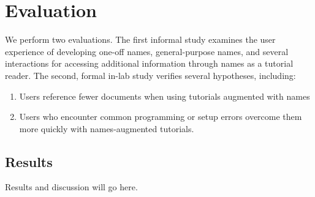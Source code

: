 \section{Evaluation}

We perform two evaluations.
The first informal study examines the user experience of developing one-off \glspl{name}, general-purpose \glspl{name}, and several interactions for accessing additional information through \glspl{name} as a tutorial reader.
The second, formal in-lab study verifies several hypotheses, including:
\noindent
\begin{enumerate}%
\item Users reference fewer documents when using tutorials augmented with \glspl{name}
\item Users who encounter common programming or setup errors overcome them more quickly with \glspl{name}-augmented tutorials.
\end{enumerate}

\subsection{Results}

Results and discussion will go here.
